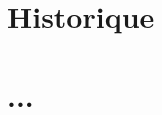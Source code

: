 \documentclass[12pt,oneside]{report}
\begin{document}
\begin{spacing}{1.2}


\section{Historique}




\section{...}






\end{spacing}
\end{document}
